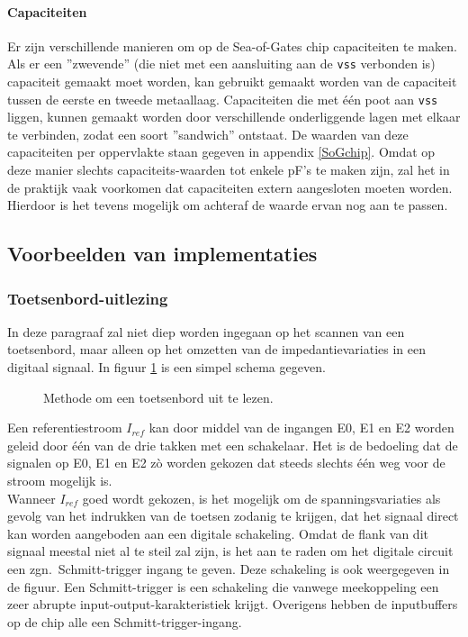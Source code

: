 \paragraph{Capaciteiten}
Er zijn verschillende manieren om op de Sea-of-Gates chip capaciteiten te maken.
Als er een ''zwevende'' (die niet met een aansluiting aan de {\tt vss} verbonden is) capaciteit gemaakt moet worden,
kan gebruikt gemaakt worden van de capaciteit tussen de eerste en tweede metaallaag.
Capaciteiten die met \'e\'en poot aan {\tt vss} liggen,
kunnen gemaakt worden door verschillende onderliggende lagen met elkaar te verbinden,
zodat een soort ''sandwich'' ontstaat.
De waarden van deze capaciteiten per oppervlakte staan gegeven in appendix \ref{SoGchip}.
Omdat op deze manier slechts capaciteits-waarden tot enkele pF's te maken zijn,
zal het in de praktijk vaak voorkomen dat capaciteiten extern aangesloten moeten worden.
Hierdoor is het tevens mogelijk om achteraf de waarde ervan nog aan te passen.


\subsection{Voorbeelden van implementaties} 


\subsubsection{Toetsenbord-uitlezing}


In deze paragraaf zal niet diep worden ingegaan op het scannen van een toetsenbord, maar alleen op het omzetten van de impedantievariaties in een digitaal signaal.
In figuur \ref{TOETS} is een simpel schema gegeven.


\begin{figure}[bth]
\centerline{}
\caption{Methode om een toetsenbord uit te lezen.}
\label{TOETS}
\end{figure}





Een referentiestroom $I_{re\!f}$ kan door middel van de ingangen E0, E1 en E2 worden geleid door \'e\'en van de drie takken met een schakelaar.
Het is de bedoeling dat de signalen op E0, E1 en E2 z\`o worden gekozen dat steeds slechts \'e\'en weg voor de stroom mogelijk is.\\
Wanneer $I_{re\!f}$ goed wordt gekozen,
is het mogelijk om de spanningsvariaties als gevolg van het indrukken van de toetsen zodanig te krijgen,
dat het signaal direct kan worden aangeboden aan een digitale schakeling.
Omdat de flank van dit signaal meestal niet al te steil zal zijn,
is het aan te raden om het digitale circuit een zgn.\ Schmitt-trigger ingang te geven.
Deze schakeling is ook weergegeven in de figuur.
Een Schmitt-trigger is een schakeling die vanwege meekoppeling een zeer abrupte input-output-karakteristiek krijgt.
Overigens hebben de inputbuffers op de chip alle een Schmitt-trigger-ingang.


